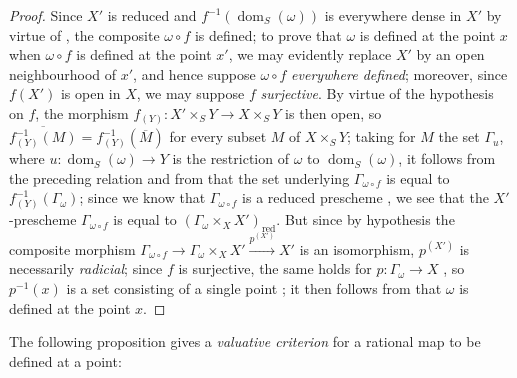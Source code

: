 \begin{proof}
Since $X'$ is reduced and $f^{-1}(\operatorname{dom}_S(\omega))$ is everywhere dense in $X'$ by virtue of , the composite $\omega\circ f$ is defined; to prove that $\omega$ is defined at the point $x$ when $\omega\circ f$ is defined at the point $x'$, we may evidently replace $X'$ by an open neighbourhood of $x'$, and hence suppose $\omega\circ f$ \emph{everywhere defined}; moreover, since $f(X')$ is open in $X$, we may suppose $f$ \emph{surjective}.
By virtue of the hypothesis on $f$, the morphism $f_{(Y)}:X'\times_S Y\to X\times_S Y$ is then open, so $\overline{f_{(Y)}^{-1}(M)}=f_{(Y)}^{-1}(\overline{M})$ for every subset $M$ of $X\times_S Y$; taking for $M$ the set $\Gamma_u$, where $u:\operatorname{dom}_S(\omega)\to Y$ is the restriction of $\omega$ to $\operatorname{dom}_S(\omega)$, it follows from the preceding relation and from  that the set underlying $\Gamma_{\omega\circ f}$ is equal to $f_{(Y)}^{-1}(\Gamma_\omega)$; since we know
that $\Gamma_{\omega\circ f}$ is a reduced prescheme , we see that the $X'$-prescheme $\Gamma_{\omega\circ f}$ is equal to $(\Gamma_\omega\times_X X')_\mathrm{red}$.
But since by hypothesis the composite morphism $\Gamma_{\omega\circ f}\to\Gamma_\omega\times_X X'\xrightarrow{p^{(X')}}X'$ is an isomorphism, $p^{(X')}$ is necessarily \emph{radicial}; since $f$ is surjective, the same holds for $p:\Gamma_\omega\to X$ , so $p^{-1}(x)$ is a set consisting of a single point ; it then follows from  that $\omega$ is defined at the point $x$.
\end{proof}

The following proposition gives a \emph{valuative criterion} for a rational map to be defined at a point:

